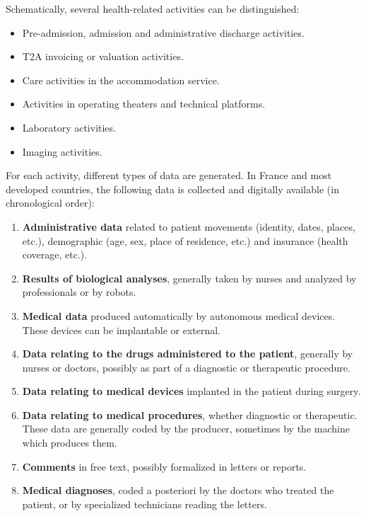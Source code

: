 \newpage
Schematically, several health-related activities can be distinguished\cite{martigneneVisualisationUnifieeDonnees}:
\begin{itemize}
  \renewcommand{\labelitemi}{$\bullet$}
  \item Pre-admission, admission and administrative discharge activities.
  \item T2A invoicing or valuation activities.
  \item Care activities in the accommodation service.
  \item Activities in operating theaters and technical platforms.
  \item Laboratory activities.
  \item Imaging activities.
\end{itemize}

For each activity, different types of data are generated. In France and most developed countries, the following data is collected and digitally available (in chronological order)\cite{ATIHAgenceTechnique,boracle2009detection}:
\label{chap:healthData}
\begin{enumerate}
  \item \textbf{Administrative data} related to patient movements (identity, dates, places, etc.), demographic (age, sex, place of residence, etc.) and insurance (health coverage, etc.).
  \item \textbf{Results of biological analyses}, generally taken by nurses and analyzed by professionals or by robots.
  \item \textbf{Medical data} produced automatically by autonomous medical devices. These devices can be implantable or external.
  \item \textbf{Data relating to the drugs administered to the patient},
  generally by nurses or doctors, possibly as part of a diagnostic or therapeutic procedure.
  \item \textbf{Data relating to medical devices} implanted in the patient during surgery.
  \item \textbf{Data relating to medical procedures}, whether diagnostic or therapeutic. These data are generally coded by the producer, sometimes by the machine which produces them.
  \item \textbf{Comments} in free text, possibly formalized in letters or reports.
  \item \textbf{Medical diagnoses}, coded a posteriori by the doctors who treated the patient, or by specialized technicians reading the letters\cite{emmanuelchazardReutilisationFouilleDonnees2017}.
\end{enumerate}


